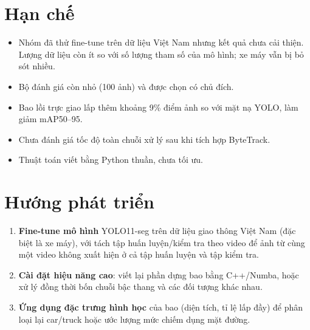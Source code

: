 \section{Hạn chế}
\begin{itemize}
  \item Nhóm đã thử fine-tune trên dữ liệu Việt Nam nhưng kết quả chưa cải thiện. Lượng dữ liệu còn ít so với số lượng tham số của mô hình; xe máy vẫn bị bỏ sót nhiều.
  \item Bộ đánh giá còn nhỏ (100 ảnh) và được chọn có chủ đích.
  \item Bao lồi trực giao lấp thêm khoảng 9\% điểm ảnh so với mặt nạ YOLO, làm giảm mAP50--95.
  \item Chưa đánh giá tốc độ toàn chuỗi xử lý sau khi tích hợp ByteTrack.
  \item Thuật toán viết bằng Python thuần, chưa tối ưu.
\end{itemize}

\section{Hướng phát triển}
\begin{enumerate}
  \item \textbf{Fine-tune mô hình} YOLO11-seg trên dữ liệu giao thông Việt Nam (đặc biệt là xe máy), với tách tập
        huấn luyện/kiểm tra theo video để ảnh từ cùng một video không xuất hiện ở cả tập huấn luyện và tập kiểm tra.
  \item \textbf{Cài đặt hiệu năng cao}: viết lại phần dựng bao bằng C++/Numba, hoặc xử lý đồng thời bốn chuỗi bậc thang và các đối tượng khác nhau.
  \item \textbf{Ứng dụng đặc trưng hình học} của bao (diện tích, tỉ lệ lấp đầy) để phân loại lại car/truck
        hoặc ước lượng mức chiếm dụng mặt đường.
\end{enumerate}
